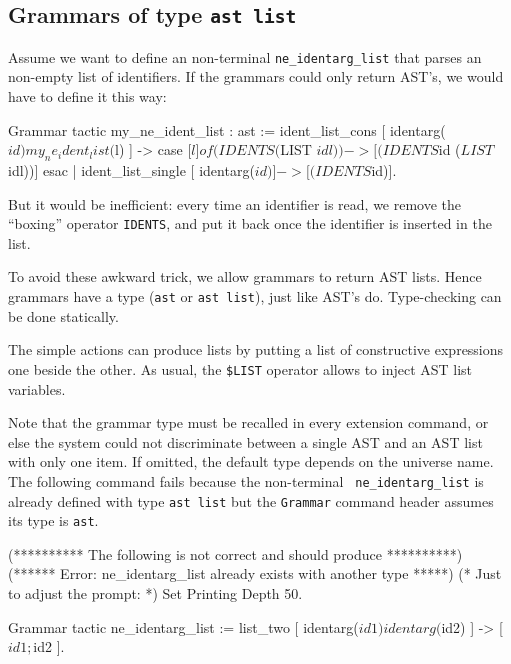 \subsection{Grammars of type {\tt ast list}}

Assume we want to define an non-terminal {\tt ne\_identarg\_list} that
parses an non-empty list of identifiers. If the grammars could only
return AST's, we would have to define it this way:

\begin{coq_example*}
Grammar tactic my_ne_ident_list : ast :=
  ident_list_cons [ identarg($id) my_ne_ident_list($l) ] ->
    case [$l] of
      (IDENTS ($LIST $idl)) -> [(IDENTS $id ($LIST $idl))]
    esac
| ident_list_single [ identarg($id) ] -> [(IDENTS $id)].
\end{coq_example*}

But it would be inefficient: every time an identifier is read, we
remove the ``boxing'' operator {\tt IDENTS}, and put it back once the
identifier is inserted in the list.

To avoid these awkward trick, we allow grammars to return AST
lists. Hence grammars have a type ({\tt ast} or {\tt ast list}), just like
AST's do. Type-checking can be done statically.

The simple actions can produce lists by putting a list of constructive
expressions one beside the other. As usual, the {\tt\$LIST} operator
allows to inject AST list variables.


Note that the grammar type must be recalled in every extension
command, or else the system could not discriminate between a single
AST and an AST list with only one item. If omitted, the default type
depends on the universe name. The following command fails because the non-terminal {\tt
ne\_identarg\_list} is already defined with type {\tt ast list} but the
{\tt Grammar} command header assumes its type is {\tt ast}.

\begin{coq_eval}
(********** The following is not correct and should produce **********)
(****** Error: ne_identarg_list already exists with another type *****)
(* Just to adjust the prompt: *) Set Printing Depth 50.
\end{coq_eval}
\begin{coq_example}           
Grammar tactic ne_identarg_list :=
  list_two [ identarg($id1) identarg($id2) ] -> [ $id1 ; $id2 ]. 
\end{coq_example}

